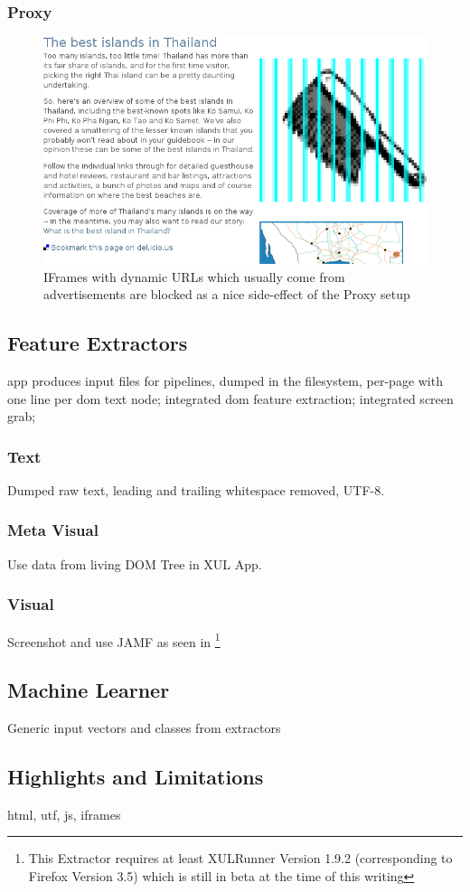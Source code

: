 \subsubsection{Proxy}

\begin{figure}
\includegraphics[width=\textwidth]{add}
\caption{IFrames with dynamic URLs which usually come from advertisements are blocked as a nice side-effect of the Proxy setup}
\end{figure}

\subsection{Feature Extractors}

app produces input files for pipelines, dumped in the filesystem, per-page with one line per dom text node;
integrated dom feature extraction;
integrated screen grab;

\subsubsection{Text}

Dumped raw text, leading and trailing whitespace removed, UTF-8.

\subsubsection{Meta Visual}

Use data from living DOM Tree in XUL App.

\subsubsection{Visual}

Screenshot and use JAMF as seen in \cite{Steger08}
\footnote{This Extractor requires at least XULRunner Version 1.9.2 (corresponding to Firefox Version 3.5) which is still in beta at the time of this writing}

\subsection{Machine Learner}

Generic input vectors and classes from extractors

\subsection{\label{sec:limitations}Highlights and Limitations}

html, utf, js, iframes
